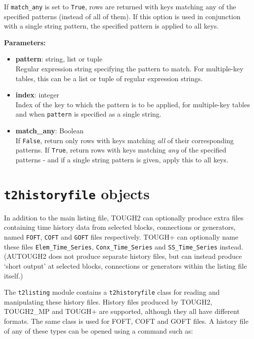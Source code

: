 If \texttt{match\_any} is set to \texttt{True}, rows are returned with keys matching any of the specified patterns (instead of all of them).  If this option is used in conjunction with a single string pattern, the specified pattern is applied to all keys.

\textbf{Parameters:}
\begin{itemize}
\item \textbf{pattern}: string, list or tuple\\
  Regular expression string specifying the pattern to match.  For multiple-key tables, this can be a list or tuple of regular expression strings.
\item \textbf{index}: integer\\
  Index of the key to which the pattern is to be applied, for multiple-key tables and when \texttt{pattern} is specified as a single string.
\item \textbf{match\_any}: Boolean\\
  If \texttt{False}, return only rows with keys matching \emph{all} of their corresponding patterns.  If \texttt{True}, return rows with keys matching \emph{any} of the specified patterns - and if a single string pattern is given, apply this to all keys.
\end{itemize}

\section{\texttt{t2historyfile} objects}

In addition to the main listing file, TOUGH2 can optionally produce extra files containing time history data from selected blocks, connections or generators, named \texttt{FOFT}, \texttt{COFT} and \texttt{GOFT} files respectively.  TOUGH+ can optionally name these files \texttt{Elem\_Time\_Series}, \texttt{Conx\_Time\_Series} and \texttt{SS\_Time\_Series} instead.  (AUTOUGH2 does not produce separate history files, but can instead produce `short output' at selected blocks, connections or generators within the listing file itself.)

The \texttt{t2listing} module contains a \texttt{t2historyfile} class for reading and manipulating these history files.  History files produced by TOUGH2, TOUGH2\_MP and TOUGH+ are supported, although they all have different formats.  The same class is used for FOFT, COFT and GOFT files.  A history file of any of these types can be opened using a command such as:

